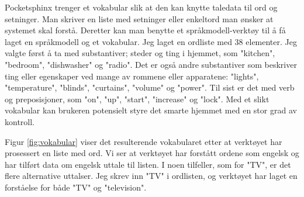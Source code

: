 Pocketsphinx trenger et vokabular slik at den kan knytte taledata til ord og setninger. Man skriver en liste med setninger eller enkeltord man ønsker at systemet skal forstå. Deretter kan man benytte et språkmodell-verktøy til å få laget en språkmodell og et vokabular. Jeg laget en ordliste med 38 elementer. Jeg valgte først å ta med substantiver; steder og ting i hjemmet, som "kitchen", "bedroom", "dishwasher" og "radio". Det er også andre substantiver som beskriver ting eller egenskaper ved mange av rommene eller apparatene: "lights", "temperature", "blinds", "curtains", "volume" og "power". Til sist er det med verb og preposisjoner, som "on", "up", "start", "increase" og "lock". Med et slikt vokabular kan brukeren potensielt styre det smarte hjemmet med en stor grad av kontroll.

Figur \ref{fig:vokabular} viser det resulterende vokabularet etter at verktøyet har prosessert en liste med ord. Vi ser at verktøyet har forstått ordene som engelsk og har tilført data om engelsk uttale til listen. I noen tilfeller, som for "TV", er det flere alternative uttalser. Jeg skrev inn "TV" i ordlisten, og verktøyet har laget en forståelse for både "TV" og "television".

